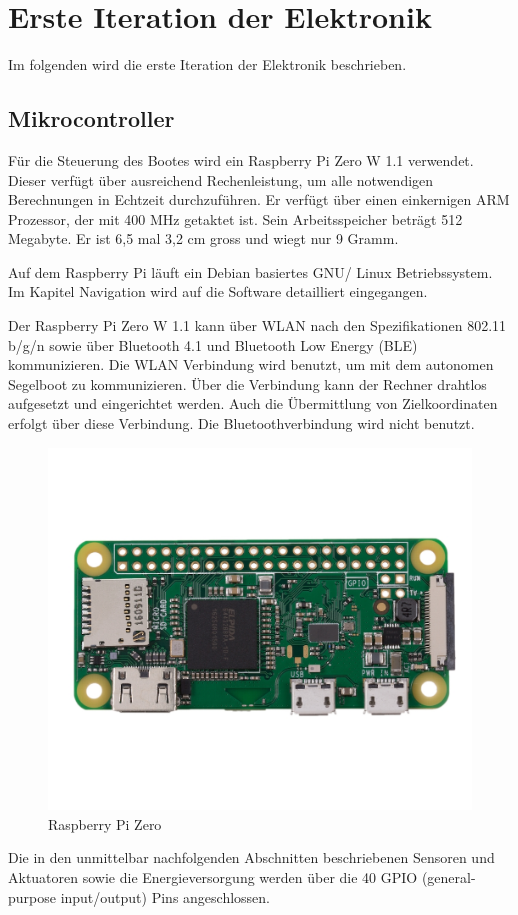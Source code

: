 

\chapter{Erste Iteration der Elektronik}
\label{appendix:elektronik}


Im folgenden wird die erste Iteration der Elektronik beschrieben.


\section{Mikrocontroller }
Für die Steuerung des Bootes wird ein Raspberry Pi Zero W 1.1 verwendet. Dieser verfügt über ausreichend Rechenleistung, um alle notwendigen Berechnungen in Echtzeit durchzuführen. Er verfügt über einen einkernigen ARM Prozessor, der mit 400 MHz getaktet ist. Sein Arbeitsspeicher beträgt 512 Megabyte. Er ist 6,5 mal 3,2 cm gross und wiegt nur 9 Gramm.

Auf dem Raspberry Pi läuft ein Debian basiertes GNU/ Linux Betriebssystem. Im Kapitel Navigation wird auf die Software detailliert eingegangen. 

Der Raspberry Pi Zero W 1.1 kann über WLAN nach den Spezifikationen 802.11 b/g/n sowie über Bluetooth 4.1 und Bluetooth Low Energy (BLE) kommunizieren. Die WLAN Verbindung wird benutzt, um mit dem autonomen Segelboot zu kommunizieren. Über die Verbindung kann der Rechner drahtlos aufgesetzt und eingerichtet werden. Auch die Übermittlung von Zielkoordinaten erfolgt über diese Verbindung. Die Bluetoothverbindung wird nicht benutzt.
\begin{figure}
    \centering
    \includegraphics[width=0.5\linewidth]{assets/raspi Zero.jpg}
    \caption{Raspberry Pi Zero }
    \label{fig:enter-label}
\end{figure}

Die in den unmittelbar nachfolgenden Abschnitten beschriebenen Sensoren und Aktuatoren sowie die Energieversorgung werden über die 40 GPIO (general-purpose input/output) Pins angeschlossen. 

